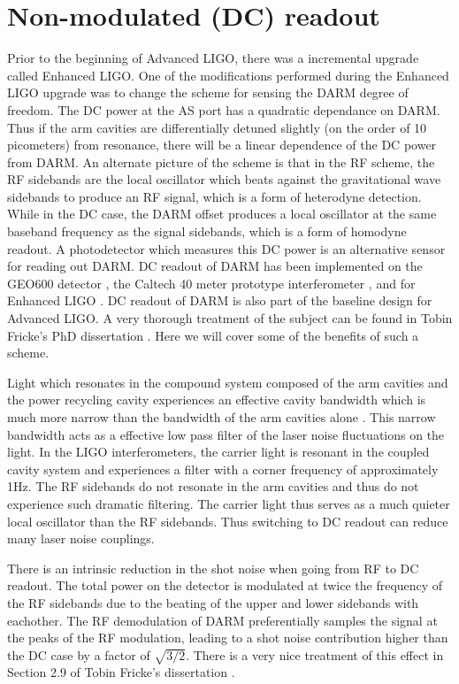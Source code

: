 \section{Non-modulated (DC) readout}
\label{sec:dcreadout}
Prior to the beginning of Advanced LIGO, there was a incremental upgrade called Enhanced LIGO. %
One of the modifications performed during the Enhanced LIGO upgrade was to change the scheme for sensing the DARM degree of freedom. %
The DC power at the AS port has a quadratic dependance on DARM. %
Thus if the arm cavities are differentially detuned slightly (on the order of 10 picometers) from resonance, there will be a linear dependence of the DC power from DARM. %
An alternate picture of the scheme is that in the RF scheme, the RF sidebands are the local oscillator which beats against the gravitational wave sidebands to produce an RF signal, which is a form of heterodyne detection. %
While in the DC case, the DARM offset produces a local oscillator at the same baseband frequency as the signal sidebands, which is a form of homodyne readout. %
A photodetector which measures this DC power is an alternative sensor for reading out DARM. %
DC readout of DARM has been implemented on the GEO600 detector \cite{GEODC}, the Caltech 40 meter prototype interferometer \cite{40mDC}, and for Enhanced LIGO \cite{Tobin}. %
DC readout of DARM is also part of the baseline design for Advanced LIGO. %
A very thorough treatment of the subject can be found in Tobin Fricke's PhD dissertation \cite{FrickeThesis}. %
Here we will cover some of the benefits of such a scheme.

Light which resonates in the compound system composed of the arm cavities and the power recycling cavity experiences an effective cavity bandwidth which is much more narrow than the bandwidth of the arm cavities alone \cite{Rakhmanov}. %
This narrow bandwidth acts as a effective low pass filter of the laser noise fluctuations on the light. %
In the LIGO interferometers, the carrier light is resonant in the coupled cavity system and experiences a filter with a corner frequency of approximately 1Hz. %
The RF sidebands do not resonate in the arm cavities and thus do not experience such dramatic filtering. %
The carrier light thus serves as a much quieter local oscillator than the RF sidebands. %
Thus switching to DC readout can reduce many laser noise couplings.

There is an intrinsic reduction in the shot noise when going from RF to DC readout. %
The total power on the detector is modulated at twice the frequency of the RF sidebands due to the beating of the upper and lower sidebands with eachother. %
The RF demodulation of DARM preferentially samples the signal at the peaks of the RF modulation, leading to a shot noise contribution higher than the DC case by a factor of $\sqrt{3/2}$. %
There is a very nice treatment of this effect in Section 2.9 of Tobin Fricke's dissertation \cite{FrickeThesis}.


